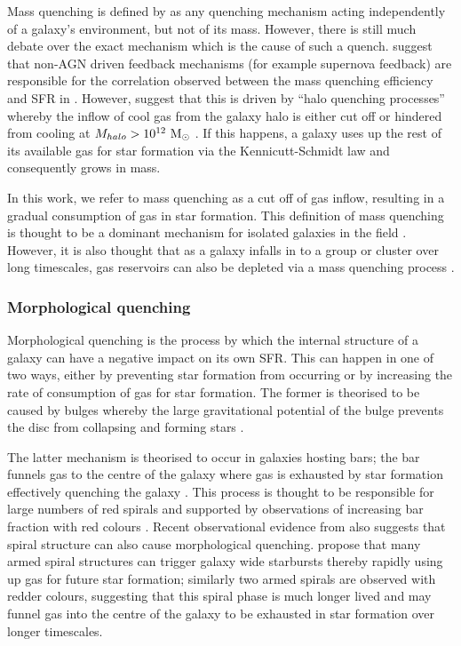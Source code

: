 \documentclass[useAMS,usenatbib]{mn2e}
\begin{document}
Mass quenching is defined by \citet{peng10, peng12} as any quenching mechanism acting independently of a galaxy's environment, but not of its mass. However, there is still much debate over the exact mechanism which is the cause of such a quench. \citet{darvish16} suggest that non-AGN driven feedback mechanisms (for example supernova feedback) are responsible for the correlation observed between the mass quenching efficiency and SFR in \citet{peng10}. However, \citet{gabor15} suggest that this is driven by ``halo quenching processes'' whereby the inflow of cool gas from the galaxy halo is either cut off or hindered from cooling at $M_{halo} > 10^{12}~\rm{M}_{\odot}$ \citep{birnboim03, dekel06}. If this happens, a galaxy uses up the rest of its available gas for star formation via the Kennicutt-Schmidt law \citep{schmidt59, kennicutt98} and consequently grows in mass.

In this work, we refer to mass quenching as a cut off of gas inflow, resulting in a gradual consumption of gas in star formation. This definition of mass quenching is thought to be a dominant mechanism for isolated galaxies in the field \citep{kormendy04}. However, it is also thought that as a galaxy infalls in to a group or cluster over long timescales, gas reservoirs can also be depleted via a mass quenching process \citep{peng12}. 

 
\subsubsection{Morphological quenching}\label{sec:morphquench}

Morphological quenching is the process by which the internal structure of a galaxy can have a negative impact on its own SFR. This can happen in one of two ways, either by preventing star formation from occurring or by increasing the rate of consumption of gas for star formation. The former is theorised to be caused by bulges \citep{bluck14} whereby the large gravitational potential of the bulge prevents the disc from collapsing and forming stars \citep{Fang13}. 

The latter mechanism is theorised to occur in galaxies hosting bars; the bar funnels gas to the centre of the galaxy \citep{athanassoula92a} where gas is exhausted by star formation effectively quenching the galaxy \citep{zurita04, sheth05}. This process is thought to be responsible for large numbers of red spirals and supported by observations of increasing bar fraction with red colours \citep{masters11a}. Recent observational evidence from \cite{hart16} also suggests that spiral structure can also cause morphological quenching. \citeauthor{hart16} propose that many armed spiral structures can trigger galaxy wide starbursts thereby rapidly using up gas for future star formation; similarly two armed spirals are observed with redder colours, suggesting that this spiral phase is much longer lived and may funnel gas into the centre of the galaxy to be exhausted in star formation over longer timescales.  
 
\end{document}
